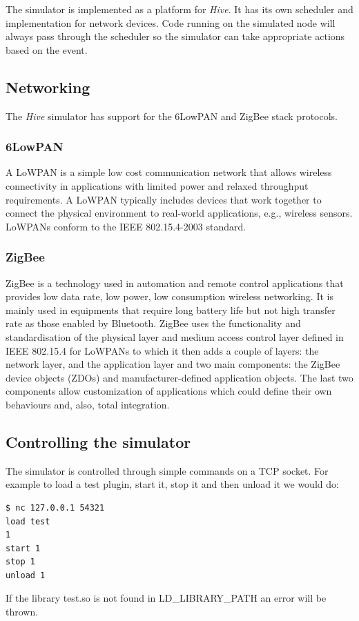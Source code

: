The simulator is implemented as a platform for \textit{Hive}. It has its own scheduler
and implementation for network devices. Code running on the simulated node
will always pass through the scheduler so the simulator can take appropriate
actions based on the event.

\subsection{Networking}

The \textit{Hive} simulator has support for the 6LowPAN and ZigBee stack protocols.

\subsubsection{6LowPAN\cite{6lowpan}}
A LoWPAN is a simple low cost communication network that allows
wireless connectivity in applications with limited power and relaxed
throughput requirements. A LoWPAN typically includes devices that
work together to connect the physical environment to real-world
applications, e.g., wireless sensors. LoWPANs conform to the IEEE
802.15.4-2003 standard.


\subsubsection{ZigBee}
ZigBee is a technology used in automation and remote control applications that
provides low data rate, low power, low consumption wireless networking. It is mainly
used in equipments that require long battery life but not high transfer rate as those
enabled by Bluetooth.
ZigBee uses the functionality and standardisation of the physical layer and
medium access control layer defined in IEEE 802.15.4 for LoWPANs to which it then adds
a couple of layers: the network layer, and the application layer and two main
components: the ZigBee device objects (ZDOs) and manufacturer-defined application objects.
The last two components allow customization of applications which could define
their own behaviours and, also, total integration.


\subsection{Controlling the simulator}

The simulator is controlled through simple commands on a TCP socket. For
example to load a test plugin, start it, stop it and then unload it we would
do:
\begin{lstlisting}
$ nc 127.0.0.1 54321
load test
1
start 1
stop 1
unload 1
\end{lstlisting}

If the library test.so is not found in LD\_LIBRARY\_PATH an error will be
thrown.

